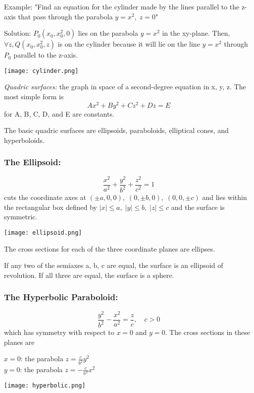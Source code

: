 \documentclass[12pt]{article}
\begin{document}
Example:
"Find an equation for the cylinder made by the lines parallel to the z-axis that pass through the parabola $y = x^2, \; z=0$"

Solution:
$P_0 (x_0, x_0^2, 0)$ lies on the parabola $y=x^2$ in the xy-plane. Then, $\forall z, Q(x_0, x_0^2, z)$ is on the cylinder because it will lie on the line $y=x^2$ through $P_0$ parallel to the z-axis. 

\begin{center}
    \texttt{[image: cylinder.png]} 
\end{center}

\emph{Quadric surfaces:} the graph in space of a second-degree equation in x, y, z. The most simple form is 
$$Ax^2 + By^2 + Cz^2 + Dz = E$$
for A, B, C, D, and E are constants.

The basic quadric surfaces are ellipsoids, paraboloids, elliptical cones, and hyperboloids. 

\subsubsection{The Ellipsoid:}
$$\frac{x^2}{a^2} + \frac{y^2}{b^2} + \frac{z^2}{c^2} = 1$$
cuts the coordinate axes at $(\pm a, 0, 0),\;(0, \pm b, 0),\;(0, 0, \pm c)$ and lies within the rectangular box defined by $|x| \leq a, \; |y| \leq b, \; |z| \leq c$ and the surface is symmetric.

\texttt{[image: ellipsoid.png]}

The cross sections for each of the three coordinate planes are ellipses.

If any two of the semiaxes a, b, c are equal, the surface is an ellipsoid of revolution. If all three are  equal, the surface is a sphere.

\subsubsection{The Hyperbolic Paraboloid:}
$$\frac{y^2}{b^2} - \frac{x^2}{a^2} = \frac{z}{c}, \quad c> 0$$
which has symmetry with respect to $x= 0$ and $y=0$. The cross sections in these planes are 
\begin{center}
    $x =0$: \quad the parabola $z = \frac{c}{b^2} y^2$\\
    $y=0$: \quad the parabola $z = - \frac{c}{a^2} x^2$
\end{center}

\texttt{[image: hyperbolic.png]}
\end{document}
